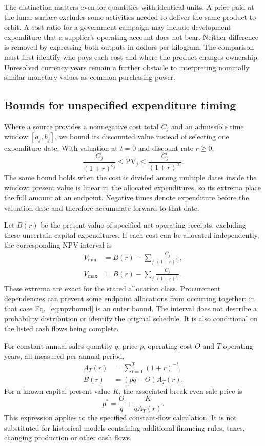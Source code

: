 \documentclass[final,5p,times,twocolumn]{elsarticle}
\begin{document}
The distinction matters even for quantities with identical units. A price paid at the lunar surface excludes some activities needed to deliver the same product to orbit. A cost ratio for a government campaign may include development expenditure that a supplier's operating account does not bear. Neither difference is removed by expressing both outputs in dollars per kilogram. The comparison must first identify who pays each cost and where the product changes ownership. Unresolved currency years remain a further obstacle to interpreting nominally similar monetary values as common purchasing power.

\subsection{Bounds for unspecified expenditure timing}
Where a source provides a nonnegative cost total $C_j$ and an admissible time window $[a_j,b_j]$, we bound its discounted value instead of selecting one expenditure date. With valuation at $t=0$ and discount rate $r\ge0$,
\begin{equation}
\frac{C_j}{(1+r)^{b_j}}\le
\mathrm{PV}_j\le
\frac{C_j}{(1+r)^{a_j}}.
\label{eq:pvbound}
\end{equation}
The same bound holds when the cost is divided among multiple dates inside the window: present value is linear in the allocated expenditures, so its extrema place the full amount at an endpoint. Negative times denote expenditure before the valuation date and therefore accumulate forward to that date.

Let $B(r)$ be the present value of specified net operating receipts, excluding these uncertain capital expenditures. If each cost can be allocated independently, the corresponding NPV interval is
\begin{align}
V_{\min}&=B(r)-\sum_j\frac{C_j}{(1+r)^{a_j}},\nonumber\\
V_{\max}&=B(r)-\sum_j\frac{C_j}{(1+r)^{b_j}}.
\label{eq:npvbound}
\end{align}
These extrema are exact for the stated allocation class. Procurement dependencies can prevent some endpoint allocations from occurring together; in that case Eq.~\eqref{eq:npvbound} is an outer bound. The interval does not describe a probability distribution or identify the original schedule. It is also conditional on the listed cash flows being complete.

For constant annual sales quantity $q$, price $p$, operating cost $O$ and $T$ operating years, all measured per annual period,
\begin{align}
A_T(r)&=\sum_{t=1}^{T}(1+r)^{-t},\label{eq:annuity}\\
B(r)&=(pq-O)A_T(r).\label{eq:receipts}
\end{align}
For a known capital present value $K$, the associated break-even sale price is
\begin{equation}
p^*=\frac{O}{q}+\frac{K}{qA_T(r)}.
\label{eq:price}
\end{equation}
This expression applies to the specified constant-flow calculation. It is not substituted for historical models containing additional financing rules, taxes, changing production or other cash flows.
\end{document}
